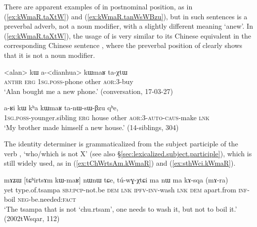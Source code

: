 There are apparent examples of  in postnominal position, as in (\ref{ex:kWmaR.taXtW}) and (\ref{ex:kWmaR.tanWsWBzu}), but in such sentences  is a preverbal adverb, not a noun modifier, with a slightly different meaning `anew'. In (\ref{ex:kWmaR.taXtW}), the usage of  is very similar to its Chinese equivalent  in the corresponding Chinese sentence , where the preverbal position of  clearly shows that it is not a noun modifier. 

\begin{exe}
\ex \label{ex:kWmaR.taXtW}
\gll <alan> kɯ a-<dianhua> kɯmaʁ ta-χtɯ \\
\textsc{anthr} \textsc{erg} \textsc{1sg}.\textsc{poss}-phone other \textsc{aor}:3\flobv{}-buy \\
\glt `Alan bought me a new phone.' (conversation, 17-03-27)
\end{exe}

\begin{exe}
\ex \label{ex:kWmaR.tanWsWBzu}
\gll a-ʁi kɯ kʰa kɯmaʁ ta-nɯ-sɯ-βzu qʰe, \\
\textsc{1sg}.\textsc{poss}-younger.sibling \textsc{erg} house other \textsc{aor}:3\flobv{}-\textsc{auto}-\textsc{caus}-make \textsc{lnk} \\
\glt `My brother made himself a new house.' (14-siblings, 304)
\end{exe}

The identity determiner  is grammaticalized from the subject participle of the verb ,  `who/which is not X' (see also §\ref{sec:lexicalized.subject.participle}), which is still widely used, as in (\ref{ex:tChWrtsAm.kWmaR}) and (\ref{ex:sthWci.kWmaR}).



\begin{exe}
\ex \label{ex:tChWrtsAm.kWmaR}
\gll mɤʑɯ [tɕʰirtsɤm kɯ-maʁ] nɯnɯ tɕe, tú-wɣ-χtɕi ma nɯ ma kɤ-sqa (mɤ-ra) \\
yet type.of.tsampa \textsc{sbj}:\textsc{pcp}-not.be \textsc{dem} \textsc{lnk} \textsc{ipfv}-\textsc{inv}-wash \textsc{lnk} \textsc{dem} apart.from \textsc{inf}-boil \textsc{neg}-be.needed:\textsc{fact} \\
\glt `The tsampa that is not `chu.rtsam', one needs to wash it, but not to boil it.' (2002tWsqar, 112)
\end{exe}

